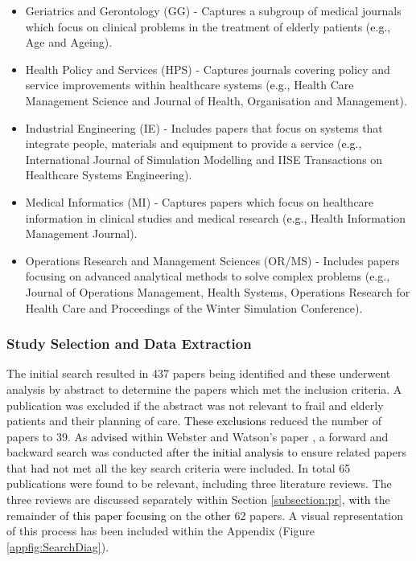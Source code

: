 \documentclass[../thesis.tex]{subfiles}
\begin{document}
\begin{itemize}
    \item Geriatrics and Gerontology (GG) - Captures a subgroup of medical journals which focus on clinical problems in the treatment of elderly patients (\textcolor{black}{e.g.,} Age and Ageing).
    \item Health Policy and Services (HPS) - Captures journals covering policy and service improvements within healthcare systems (\textcolor{black}{e.g.,} Health Care Management Science and Journal of Health, Organisation and Management).
    \item Industrial Engineering (IE) - Includes papers that focus on systems that integrate people, materials and equipment to provide a service (\textcolor{black}{e.g.,} International Journal of Simulation Modelling and IISE Transactions on Healthcare Systems Engineering).
    \item Medical Informatics (MI) - Captures papers which focus on healthcare information in clinical studies and medical research (\textcolor{black}{e.g.,} Health Information Management Journal).
    \item Operations Research and Management Sciences (OR/MS) - Includes papers focusing on advanced analytical methods to solve complex problems (e.g., Journal of Operations Management, Health Systems, Operations Research for Health Care and Proceedings of the Winter Simulation Conference).
\end{itemize}

\subsubsection{Study Selection and Data Extraction}
The initial search resulted in 437 papers being identified and \textcolor{black}{these} underwent analysis by abstract to determine the papers which met the inclusion criteria. A publication was excluded if the abstract was not relevant to frail and elderly patients and their planning of care. \textcolor{black}{These exclusions} reduced the number of papers to 39. As \textcolor{black}{advised} within Webster and Watson's paper \cite{Webster}, a forward and backward search was conducted \textcolor{black}{after the initial analysis} to ensure related papers that \textcolor{black}{had} not met all the key search criteria were included.
In total 65 publications were found to be relevant, including three literature reviews. The three reviews are discussed separately within Section \ref{subsection:pr}, \textcolor{black}{with} the remainder of \textcolor{black}{this paper focusing} on the \textcolor{black}{other} 62 papers. A visual representation of this process has been included within the Appendix (Figure \ref{appfig:SearchDiag}). 
\end{document}
